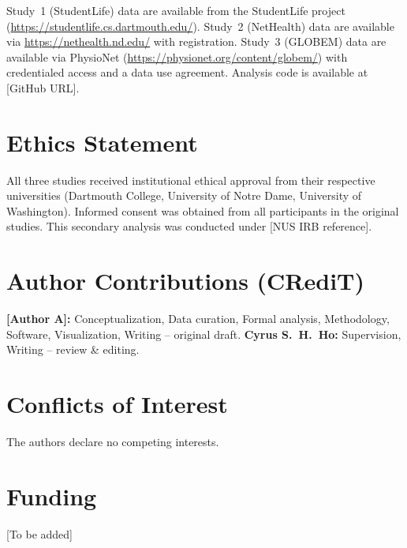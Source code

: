 \documentclass[12pt, a4paper]{article}
\begin{document}
Study~1 (StudentLife) data are available from the StudentLife project (\url{https://studentlife.cs.dartmouth.edu/}). Study~2 (NetHealth) data are available via \url{https://nethealth.nd.edu/} with registration. Study~3 (GLOBEM) data are available via PhysioNet (\url{https://physionet.org/content/globem/}) with credentialed access and a data use agreement. Analysis code is available at [GitHub URL].

\section*{Ethics Statement}

All three studies received institutional ethical approval from their respective universities (Dartmouth College, University of Notre Dame, University of Washington). Informed consent was obtained from all participants in the original studies. This secondary analysis was conducted under [NUS IRB reference].

\section*{Author Contributions (CRediT)}

\textbf{[Author A]:} Conceptualization, Data curation, Formal analysis, Methodology, Software, Visualization, Writing -- original draft. \textbf{Cyrus S.~H.~Ho:} Supervision, Writing -- review \& editing.

\section*{Conflicts of Interest}

The authors declare no competing interests.

\section*{Funding}

[To be added]






\end{document}
